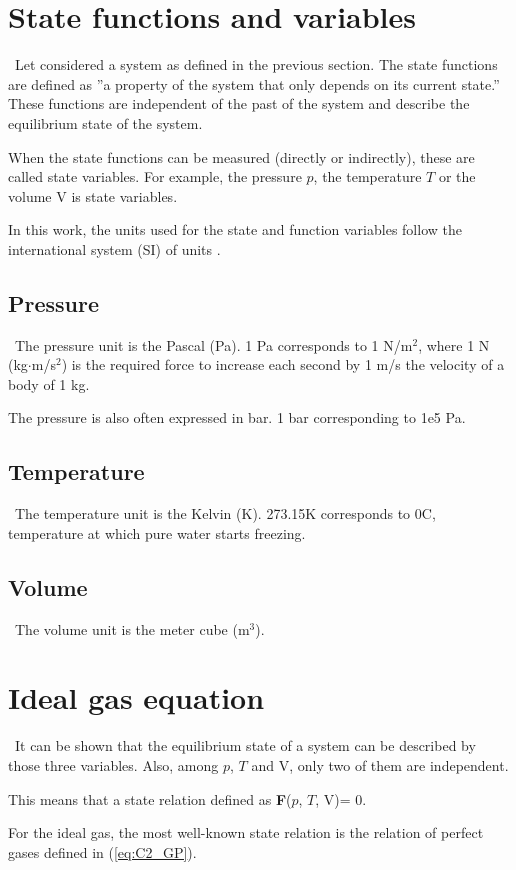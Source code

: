 \section{State functions and variables}\label{sect:C2_State}
\quad\, Let considered a system as defined in the previous section. The state functions are defined as ''a property of the system that only depends on its current state.” These functions are independent of the past of the system and describe the equilibrium state of the system.

When the state functions can be measured (directly or indirectly), these are called state variables. For example, the pressure $p$, the temperature $T$ or the volume $\mathrm{V}$ is state variables.

In this work, the units used for the state and function variables follow the international system (SI) of units \cite{Nist}. 
\subsection{Pressure}
\quad\, The pressure unit is the Pascal (Pa). 1 Pa corresponds to 1 N/m$^2$, where 1 N (kg$\cdot$m/s$^2$) is the required force to increase each second by 1 m/s the velocity of a body of 1 kg.

The pressure is also often expressed in bar. 1 bar corresponding to 1e5 Pa.
\subsection{Temperature}
\quad\, The temperature unit is the Kelvin (K). 273.15\degree K corresponds to 0\degree C, temperature at which pure water starts freezing.
\subsection{Volume}
\quad\, The volume unit is the meter cube (m$^3$).
\section{Ideal gas equation}
\quad\, It can be shown that the equilibrium state of a system can be described by those three variables. Also, among $p$,  $T$ and $\mathrm{V}$, only two of them are independent. 

This means that a state relation defined as \textbf{F}($p$, $T$, $\mathrm{V}$)= 0.

For the ideal gas, the most well-known state relation is the relation of perfect gases defined in (\ref{eq:C2_GP}).

